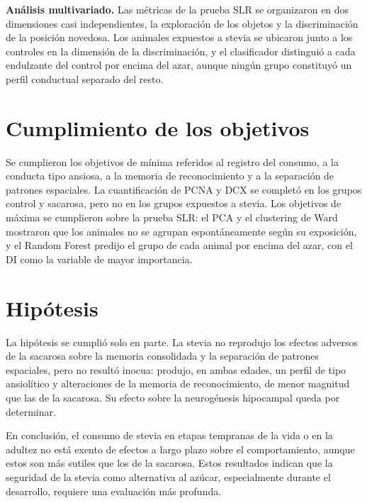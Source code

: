 \textbf{Análisis multivariado.} Las métricas de la prueba SLR se organizaron en dos dimensiones casi independientes, la exploración de los objetos y la discriminación de la posición novedosa. Los animales expuestos a stevia se ubicaron junto a los controles en la dimensión de la discriminación, y el clasificador distinguió a cada endulzante del control por encima del azar, aunque ningún grupo constituyó un perfil conductual separado del resto.

\section*{Cumplimiento de los objetivos}

Se cumplieron los objetivos de mínima referidos al registro del consumo, a la conducta tipo ansiosa, a la memoria de reconocimiento y a la separación de patrones espaciales. La cuantificación de PCNA y DCX se completó en los grupos control y sacarosa, pero no en los grupos expuestos a stevia. Los objetivos de máxima se cumplieron sobre la prueba SLR: el PCA y el clustering de Ward mostraron que los animales no se agrupan espontáneamente según su exposición, y el Random Forest predijo el grupo de cada animal por encima del azar, con el DI como la variable de mayor importancia.

\section*{Hipótesis}

La hipótesis se cumplió solo en parte. La stevia no reprodujo los efectos adversos de la sacarosa sobre la memoria consolidada y la separación de patrones espaciales, pero no resultó inocua: produjo, en ambas edades, un perfil de tipo ansiolítico y alteraciones de la memoria de reconocimiento, de menor magnitud que las de la sacarosa. Su efecto sobre la neurogénesis hipocampal queda por determinar.

En conclusión, el consumo de stevia en etapas tempranas de la vida o en la adultez no está exento de efectos a largo plazo sobre el comportamiento, aunque estos son más sutiles que los de la sacarosa. Estos resultados indican que la seguridad de la stevia como alternativa al azúcar, especialmente durante el desarrollo, requiere una evaluación más profunda.
